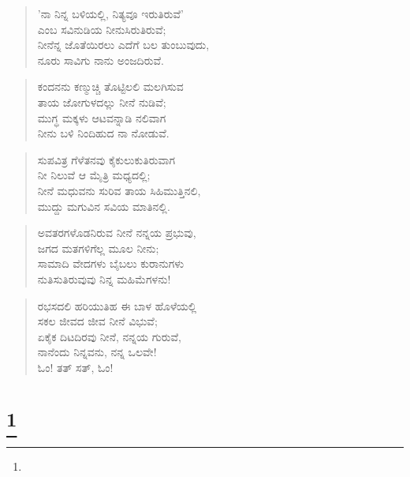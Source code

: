 \begin{verse}
'ನಾ ನಿನ್ನ ಬಳಿಯಲ್ಲಿ, ನಿತ್ಯವೂ ಇರುತಿರುವೆ'\\ಎಂಬ ಸವಿನುಡಿಯ ನೀನುಸಿರುತಿರುವೆ;\\ನೀನೆನ್ನ ಜೊತೆಯಿರಲು ಎದೆಗೆ ಬಲ ತುಂಬುವುದು,\\ನೂರು ಸಾವಿಗು ನಾನು ಅಂಜದಿರುವೆ.
\end{verse}

\begin{verse}
ಕಂದನನು ಕಣ್ಮುಚ್ಚಿ ತೊಟ್ಟಿಲಲಿ ಮಲಗಿಸುವ\\ತಾಯ ಜೋಗುಳದಲ್ಲು ನೀನೆ ನುಡಿವೆ; \\ಮುಗ್ಧ ಮಕ್ಕಳು ಆಟವನ್ನಾಡಿ ನಲಿವಾಗ\\ನೀನು ಬಳಿ ನಿಂದಿಹುದ ನಾ ನೋಡುವೆ.
\end{verse}

\begin{verse}
ಸುಪವಿತ್ರ ಗೆಳೆತನವು ಕೈಕುಲುಕುತಿರುವಾಗ\\ನೀ ನಿಲುವೆ ಆ ಮೈತ್ರಿ ಮಧ್ಯದಲ್ಲಿ;\\ನೀನೆ ಮಧುವನು ಸುರಿವ ತಾಯ ಸಿಹಿಮುತ್ತಿನಲಿ,\\ಮುದ್ದು ಮಗುವಿನ ಸವಿಯ ಮಾತಿನಲ್ಲಿ.
\end{verse}

\begin{verse}
ಅವತರಗಳೊಡನಿರುವ ನೀನೆ ನನ್ನಯ ಪ್ರಭುವು,\\ಜಗದ ಮತಗಳಿಗೆಲ್ಲ ಮೂಲ ನೀನು;\\ಸಾಮಾದಿ ವೇದಗಳು ಬೈಬಲು ಕುರಾನುಗಳು\\ನುತಿಸುತಿರುವುವು ನಿನ್ನ ಮಹಿಮೆಗಳನು! 
\end{verse}

\begin{verse}
ರಭಸದಲಿ ಹರಿಯುತಿಹ ಈ ಬಾಳ ಹೊಳೆಯಲ್ಲಿ\\ಸಕಲ ಜೀವದ ಜೀವ ನೀನೆ ವಿಭುವೆ;\\ಏಕೈಕ ದಿಟದಿರವು ನೀನೆ, ನನ್ನಯ ಗುರುವೆ,\\ನಾನೆಂದು ನಿನ್ನವನು, ನನ್ನ ಒಲವೇ!\\ಓಂ! ತತ್ ಸತ್, ಓಂ!
\end{verse}

\selecteng

\chapter[THE SONG OF THE SANNYASIN]{\protect\footnote{}}

\begin{verse}
\end{verse}

